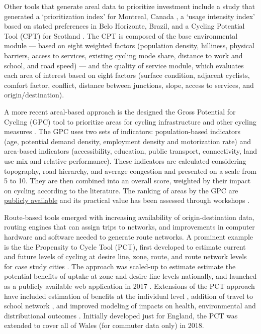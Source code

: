 \documentclass[
  super,
  preprint,
  3p]{elsarticle}
\begin{document}
Other tools that generate areal data to prioritize investment include a
study that generated a `prioritization index' for Montreal, Canada
\citep{larsen_build_2013}, a `usage intensity index' based on stated
preferences in Belo Horizonte, Brazil, and a Cycling Potential Tool
(CPT) for Scotland \citep{phillips_development_2017}. The CPT is
composed of the base environmental module --- based on eight weighted
factors (population density, hilliness, physical barriers, access to
services, existing cycling mode share, distance to work and school, and
road speed) --- and the quality of service module, which evaluates each
area of interest based on eight factors (surface condition, adjacent
cyclists, comfort factor, conflict, distance between junctions, slope,
access to services, and origin/destination).

A more recent areal-based approach is the designed the Gross Potential
for Cycling (GPC) tool to prioritize areas for cycling infrastructure
and other cycling measures \citep{silva_gross_2021}. The GPC uses two
sets of indicators: population-based indicators (age, potential demand
density, employment density and motorization rate) and area-based
indicators (accessibility, education, public transport, connectivity,
land use mix and relative performance). These indicators are calculated
considering topography, road hierarchy, and average congestion and
presented on a scale from 5 to 10. They are then combined into an
overall score, weighted by their impact on cycling according to the
literature. The ranking of areas by the GPC are
\href{https://boost.up.pt/en/ferramentas/gpc}{publicly available} and
its practical value has been assessed through workshops
\citep{silva_revealing_2022}.

Route-based tools emerged with increasing availability of
origin-destination data, routing engines that can assign trips to
networks, and improvements in computer hardware and software needed to
generate route networks. A prominent example is the the Propensity to
Cycle Tool (PCT), first developed to estimate current and future levels
of cycling at desire line, zone, route, and route network levels for
case study cities \citep{lovelace_mapping_2016}. The approach was
scaled-up to estimate estimate the potential benefits of uptake at zone
and desire line levels nationally, and launched as a publicly available
web application in 2017 \citet{lovelace2017}. Extensions of the PCT
approach have included estimation of benefits at the individual level
\citep{woodcock2018}, addition of travel to school network
\citep{goodman2019}, and improved modeling of impacts on health,
environmental and distributional outcomes \citep{woodcock2021}.
Initially developed just for England, the PCT was extended to cover all
of Wales (for commuter data only) in 2018.
\end{document}

